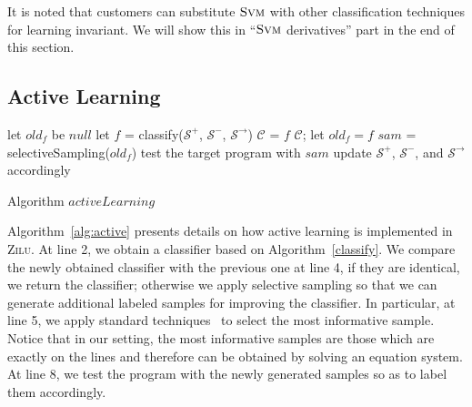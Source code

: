It is noted that customers can substitute $\textsc{Svm}$ with other classification techniques for learning invariant. 
We will show this in ``$\textsc{Svm}$ derivatives'' part in the end of this section.
 



\subsection{Active Learning} 
\begin{algorithm}[h]
\SetAlgoVlined
\Indm
{}
\Indp
let $old_f$ be $null$\;
 {
    let $f$ = classify($\mathcal{S}^+$, $\mathcal{S}^-$, $\mathcal{S}^\rightarrow$)\;
     {
    	 {
    		$\mathcal{C}$ = $f$\;
        	\Return $\mathcal{C}$;
    	}
    	let $old_f = f$\;
    }
    $sam$ = selectiveSampling($old_f$)\;
    test the target program with $sam$\;
    update $\mathcal{S}^+$, $\mathcal{S}^-$, and $\mathcal{S}^\rightarrow$ accordingly\;
}
\caption{Algorithm $activeLearning$}
\label{alg:active}
\end{algorithm}

 


Algorithm~\ref{alg:active} presents details on how active learning is implemented in \textsc{Zilu}. 
At line 2, we obtain a classifier based on Algorithm~\ref{classify}. 
We compare the newly obtained classifier with the previous one at line 4, if they are identical, we return the classifier; 
otherwise we apply selective sampling so that we can generate additional labeled samples for improving the classifier. 
In particular, at line 5, we apply standard techniques~\cite{DBLP:conf/icml/SchohnC00} to select the most informative sample. 
Notice that in our setting, the most informative samples are those which are exactly on the lines and therefore can be obtained by solving an equation system. 
At line 8, we test the program with the newly generated samples so as to label them accordingly.

